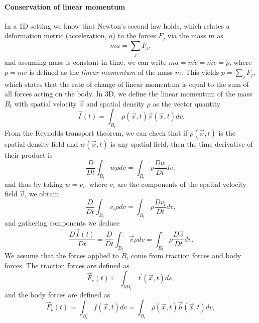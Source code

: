 \paragraph{Conservation of linear momentum} In a 1D setting we know that Newton's second law holds, which relates a deformation metric (acceleration, $a$) to the forces $F_j$ via the mass $m$ as 
\begin{equation*}
    ma = \sum_j F_j,
\end{equation*}
and assuming mass is constant in time, we can write $ma = m\dot{v} = \dot{mv} = \dot{p}$, where $p=mv$ is defined as the \emph{linear momentum} of the mass $m$. This yields $\dot{p} = \sum_j F_j$, which states that the rate of change of linear momentum is equal to the sum of all forces acting on the body. In 3D, we define the linear momentum of the mass $B_t$ with spatial velocity $\vec v$ and spatial density $\rho$ as the vector quantity
\begin{equation}
    \vec I(t) = \int_{B_t} \rho(\vec x, t) \vec v(\vec x, t) dv.
\end{equation}
From the Reynolds transport theorem, we can check that if $\rho(\vec x, t)$ is the spatial density field and $w(\vec x, t)$ is any spatial field, then the time derivative of their product is 
\begin{equation}
    \frac{D}{Dt} \int_{B_t} w\rho dv = \int_{B_t} \rho \frac{Dw}{Dt} dv,
\end{equation}
and thus by taking $w=v_i$, where $v_i$ are the components of the spatial velocity field $\vec v$, we obtain
\begin{equation}
    \frac{D}{Dt} \int_{B_t} v_i\rho dv = \int_{B_t} \rho \frac{Dv_i}{Dt} dv,
\end{equation}
and gathering components we deduce
\begin{equation}
    \frac{D\vec I(t)}{Dt} = \frac{D}{Dt} \int_{B_t} \vec v \rho dv = \int_{B_t} \rho \frac{D\vec v}{Dt} dv.
\end{equation}
We assume that the forces applied to $B_t$ come from traction forces and body forces. The traction forces are defined as 
\begin{equation}
    \vec F_{e} (t)  \coloneqq  \int_{\partial B_t} \vec t(\vec x, t) ds,
\end{equation}
and the body forces are defined as 
\begin{equation}
    \vec F_b(t)  \coloneqq  \int_{B_t} f(\vec x, t) dv = \int_{B_t} \rho(\vec x, t) \vec b(\vec x, t)dv,
\end{equation}
